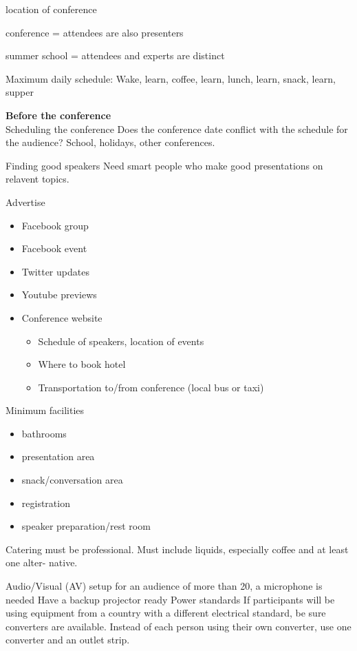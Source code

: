 location of conference

conference = attendees are also presenters

summer school = attendees and experts are distinct

Maximum daily schedule:
Wake, learn, coffee, learn, lunch, learn, snack, learn, supper

\textbf{Before the conference}\\

Scheduling the conference
Does the conference date conflict with the schedule for the audience? School, holidays, other conferences.

Finding good speakers
Need smart people who make good presentations on relavent topics.

Advertise
\begin{itemize}
\item Facebook group
\item Facebook event
\item Twitter updates
\item Youtube previews
\item Conference website
    \begin{itemize}
      \item Schedule of speakers, location of events
    \item Where to book hotel
    \item Transportation to/from conference (local bus or taxi)
    \end{itemize}
\end{itemize}
Minimum facilities
\begin{itemize}
\item bathrooms
\item presentation area
\item snack/conversation area
\item registration
\item speaker preparation/rest room
\end{itemize}

Catering must be professional. Must include liquids, especially coffee and at least one alter-
native.

Audio/Visual (AV) setup
for an audience of more than 20, a microphone is needed
Have a backup projector ready
Power standards
If participants will be using equipment from a country with a different electrical standard, be sure converters are available. Instead of each person using their own converter, use one converter and an outlet strip.


